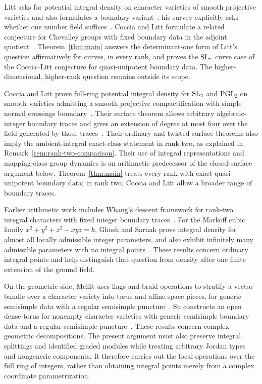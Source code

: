 Litt asks for potential integral density on character varieties of smooth
projective varieties and also formulates a boundary
variant~\cite{LittProblems}; his survey explicitly asks whether one
number field suffices~\cite[Question~5.4.3(2)]{Litt2024}.
Coccia and Litt formulate a related
conjecture for Chevalley groups with fixed boundary data in the adjoint
quotient~\cite[Conjecture~1.1.1]{CocciaLitt}. Theorem~\ref{thm:main}
answers the determinant-one form of Litt's question affirmatively for
curves, in every rank, and proves the $\operatorname{SL}_r$ curve case of the
Coccia--Litt conjecture for quasi-unipotent boundary data.
The higher-dimensional, higher-rank question remains outside its scope.

Coccia and Litt prove full-ring potential integral density for $\operatorname{SL}_2$
and $\mathrm{PGL}_2$ on smooth varieties admitting a smooth projective
compactification with simple normal crossings boundary~\cite[Theorem~1.1.2]{CocciaLitt}.
Their surface theorem allows arbitrary algebraic-integer boundary traces
and gives an extension of degree at most four over the field generated
by those traces~\cite[Theorem~5.0.4 and Remark~5.0.5]{CocciaLitt}.
Their ordinary and twisted surface theorems also imply the ambient-integral
exact-class statement in rank two, as explained in
Remark~\ref{rem:rank-two-comparison}.
Their use of integral representations and mapping-class-group dynamics
is an arithmetic predecessor of the closed-surface argument below.
Theorem~\ref{thm:main} treats every rank with exact quasi-unipotent
boundary data; in rank two, Coccia and Litt allow a broader range of
boundary traces.

Earlier arithmetic work includes Whang's descent framework for
rank-two integral characters with fixed integer boundary
traces~\cite{WhangDescent}. For the Markoff cubic family
$x^2+y^2+z^2-xyz=k$, Ghosh and Sarnak prove integral density for
almost all locally admissible integer parameters, and also exhibit
infinitely many admissible parameters with no integral
points~\cite[Theorem~1.2]{GhoshSarnak}. These results concern ordinary
integral points and help distinguish that question from density
after one finite extension of the ground field.

On the geometric side, Mellit uses flags and braid operations to stratify
a vector bundle over a character variety into torus and affine-space
pieces, for generic semisimple data with a regular semisimple
puncture~\cite[Theorem~1.2]{Mellit}. Su constructs an open dense torus
for nonempty character varieties with generic semisimple boundary data
and a regular semisimple puncture~\cite[Theorem~0.5]{Su}.
These results concern complex geometric decompositions. The present
argument must also preserve integral splittings and identified graded
modules while treating arbitrary Jordan types and nongeneric components.
It therefore carries out the local operations over the full ring of
integers, rather than obtaining integral points merely from a complex
coordinate parametrization.

